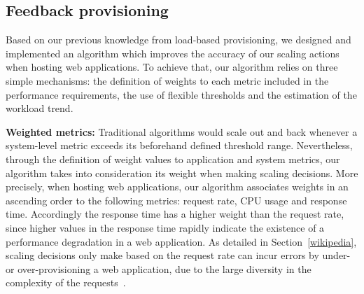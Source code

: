 





\subsection*{Feedback provisioning}


Based on our previous knowledge from load-based provisioning, we designed and implemented an algorithm which improves the accuracy of our scaling actions when hosting web applications. To achieve that, our algorithm relies on three simple mechanisms: the definition of weights to each metric included in the performance requirements, the use of flexible thresholds and the estimation of the workload trend. 

\vspace{2mm}

\textbf{Weighted metrics:} Traditional algorithms would scale out and back whenever a system-level metric exceeds its beforehand defined threshold range. Nevertheless,  through the definition of weight values to application and system metrics, our algorithm takes into consideration its weight when making scaling decisions. More precisely, when hosting web applications, our algorithm associates weights in an ascending order to the following metrics: request rate, CPU usage and response time. Accordingly the response time has a higher weight than the request rate, since higher values in the response time rapidly indicate the existence of a performance degradation in a web application. As detailed in Section~\ref{wikipedia}, scaling decisions only make based on the request rate can incur errors by under- or over-provisioning  a web application, due to the large diversity in the complexity of the requests~\cite{singh_autonomic_2010}.

